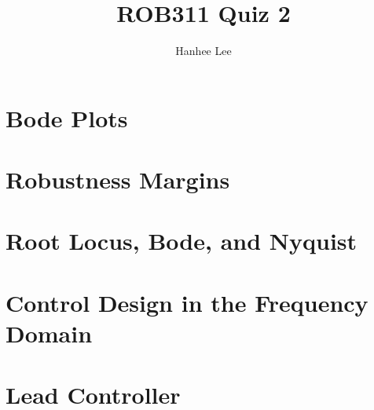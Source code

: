 \documentclass{article}
\title{ROB311 Quiz 2}
\author{Hanhee Lee}
\begin{document}
\maketitle

\tableofcontents
\newpage

\section{Bode Plots}

\newpage

\section{Robustness Margins}

\newpage

\section{Root Locus, Bode, and Nyquist}

\newpage

\section{Control Design in the Frequency Domain}

\newpage

\section{Lead Controller}

\newpage
\end{document}
